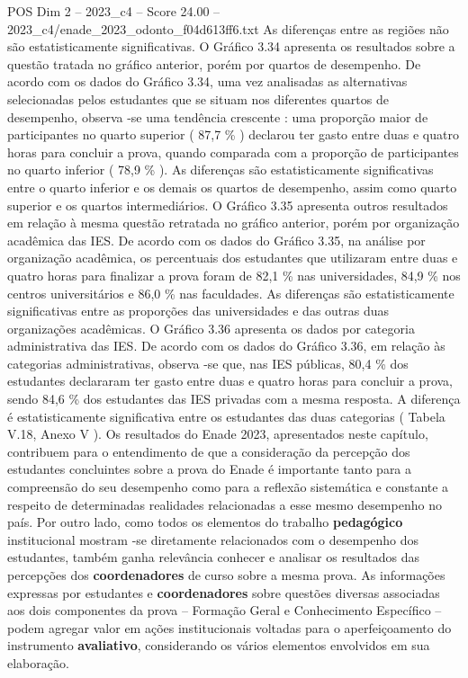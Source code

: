 \begin{textsample}{POS Dim 2 – 2023\_c4 – Score 24.00 – 2023\_c4/enade\_2023\_odonto\_f04d613ff6.txt}
As diferenças entre as regiões não são estatisticamente significativas.
O Gráfico 3.34 apresenta os resultados sobre a questão tratada no gráfico anterior, porém por quartos de desempenho.
De acordo com os dados do Gráfico 3.34, uma vez analisadas as alternativas selecionadas pelos estudantes que se situam nos diferentes quartos de desempenho, observa -se uma tendência crescente : uma proporção maior de participantes no quarto superior ( 87,7 \% ) declarou ter gasto entre duas e quatro horas para concluir a prova, quando comparada com a proporção de participantes no quarto inferior ( 78,9 \% ).
As diferenças são estatisticamente significativas entre o quarto inferior e os demais os quartos de desempenho, assim como quarto superior e os quartos intermediários.
O Gráfico 3.35 apresenta outros resultados em relação à mesma questão retratada no gráfico anterior, porém por organização acadêmica das IES.
De acordo com os dados do Gráfico 3.35, na análise por organização acadêmica, os percentuais dos estudantes que utilizaram entre duas e quatro horas para finalizar a prova foram de 82,1 \% nas universidades, 84,9 \% nos centros universitários e 86,0 \% nas faculdades.
As diferenças são estatisticamente significativas entre as proporções das universidades e das outras duas organizações acadêmicas.
O Gráfico 3.36 apresenta os dados por categoria administrativa das IES.
De acordo com os dados do Gráfico 3.36, em relação às categorias administrativas, observa -se que, nas IES públicas, 80,4 \% dos estudantes declararam ter gasto entre duas e quatro horas para concluir a prova, sendo 84,6 \% dos estudantes das IES privadas com a mesma resposta.
A diferença é estatisticamente significativa entre os estudantes das duas categorias ( Tabela V.18, Anexo V ).
Os resultados do Enade 2023, apresentados neste capítulo, contribuem para o entendimento de que a consideração da percepção dos estudantes concluintes sobre a prova do Enade é importante tanto para a compreensão do seu desempenho como para a reflexão sistemática e constante a respeito de determinadas realidades relacionadas a esse mesmo desempenho no país.
Por outro lado, como todos os elementos do trabalho \textbf{pedagógico} institucional mostram -se diretamente relacionados com o desempenho dos estudantes, também ganha relevância conhecer e analisar os resultados das percepções dos \textbf{coordenadores} de curso sobre a mesma prova.
As informações expressas por estudantes e \textbf{coordenadores} sobre questões diversas associadas aos dois componentes da prova – Formação Geral e Conhecimento Específico – podem agregar valor em ações institucionais voltadas para o aperfeiçoamento do instrumento \textbf{avaliativo}, considerando os vários elementos envolvidos em sua elaboração.

\end{textsample}
